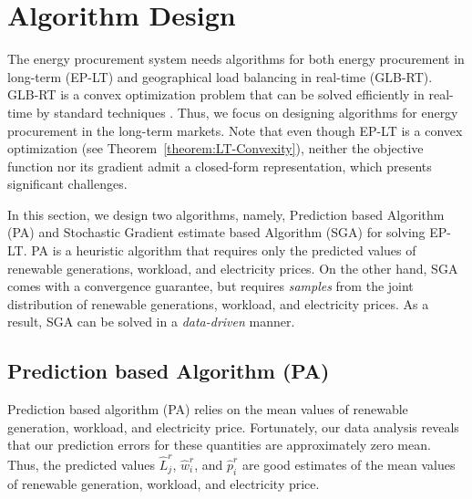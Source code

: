 \section{Algorithm Design}
\label{sec:AlgorithmDesign}

The energy procurement system needs algorithms for both energy
procurement in long-term (EP-LT) and geographical load balancing in
real-time (GLB-RT). GLB-RT is a convex optimization problem that can
be solved efficiently in real-time by standard techniques
\cite{liu2011greening}. Thus, we focus on designing algorithms for
energy procurement in the long-term markets. Note that even though
EP-LT is a convex optimization (see
Theorem~\ref{theorem:LT-Convexity}), neither the objective function
nor its gradient admit a closed-form representation, which presents significant challenges. 

In this section,
we design two algorithms, namely, Prediction based Algorithm (PA) and
Stochastic Gradient estimate based Algorithm (SGA) for solving EP-LT.
PA is a heuristic algorithm that requires only the predicted values of renewable generations, workload, and
electricity prices. 
On the other hand, SGA comes with a convergence
guarantee, but requires \emph{samples} from the joint distribution of
renewable generations, workload, and electricity prices. As a result,
SGA can be solved in a \emph{data-driven} manner.

\subsection{Prediction based Algorithm (PA)}
\label{sec:PA}

Prediction based algorithm (PA) relies on the mean
values of renewable generation, workload, and electricity
price. 
Fortunately, our data analysis reveals that our prediction errors for
these quantities are approximately zero mean.
Thus, the predicted values $\hat{L}^r_j$, $\hat{w}^r_i$, and
$\hat{p}^r_i$ are good estimates of the mean values of renewable
generation, workload, and electricity price.

